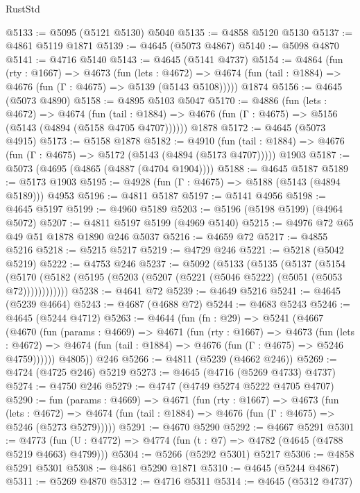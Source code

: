 \begin{lexlean}{RustStd}
\begin{coremodule}
@5133 := @5095 (@5121 @5130) @5040
@5135 := @4858 @5120 @5130
@5137 := @4861 @5119 @1871
@5139 := @4645 (@5073 @4867)
@5140 := @5098 @4870
@5141 := @4716 @5140
@5143 := @4645 (@5141 @4737)
@5154 := @4864
    (fun (rty : @1667) =>
    @4673
      (fun (lets : @4672) =>
      @4674 (fun (tail : @1884) => @4676 (fun (Γ : @4675) => @5139 (@5143 @5108)))))
    @1874
@5156 := @4645 (@5073 @4890)
@5158 := @4895 @5103 @5047
@5170 := @4886
    (fun (lets : @4672) =>
    @4674
      (fun (tail : @1884) => @4676 (fun (Γ : @4675) => @5156 (@5143 (@4894 (@5158 @4705 @4707))))))
    @1878
@5172 := @4645 (@5073 @4915)
@5173 := @5158 @1878
@5182 := @4910
    (fun (tail : @1884) => @4676 (fun (Γ : @4675) => @5172 (@5143 (@4894 (@5173 @4707)))))
    @1903
@5187 := @5073 (@4695 (@4865 (@4887 (@4704 @1904))))
@5188 := @4645 @5187
@5189 := @5173 @1903
@5195 := @4928 (fun (Γ : @4675) => @5188 (@5143 (@4894 @5189))) @4953
@5196 := @4811 @5187
@5197 := @5141 @4956
@5198 := @4645 @5197
@5199 := @4960 @5189
@5203 := @5196 (@5198 @5199) (@4964 @5072)
@5207 := @4811 @5197 @5199 (@4969 @5140)
@5215 := @4976 @72 @65 @49 @51 @1878 @1890 @246 @5037
@5216 := @4659 @72
@5217 := @4855 @5216
@5218 := @5215 @5217
@5219 := @4729 @246
@5221 := @5218 (@5042 @5219)
@5222 := @4753 @246
@5237 := @5092
    (@5133
      (@5135
        (@5137
          (@5154
            (@5170 (@5182 (@5195 (@5203 (@5207 (@5221 (@5046 @5222) (@5051 (@5053 @72))))))))))))
@5238 := @4641 @72
@5239 := @4649 @5216
@5241 := @4645 (@5239 @4664)
@5243 := @4687 (@4688 @72)
@5244 := @4683 @5243
@5246 := @4645 (@5244 @4712)
@5263 := @4644
    (fun (fn : @29) =>
    @5241
      (@4667
        (@4670
          (fun (params : @4669) =>
          @4671
            (fun (rty : @1667) =>
            @4673
              (fun (lets : @4672) =>
              @4674 (fun (tail : @1884) => @4676 (fun (Γ : @4675) => @5246 @4759))))))
        @4805))
    @246
@5266 := @4811 (@5239 (@4662 @246))
@5269 := @4724 (@4725 @246) @5219
@5273 := @4645 (@4716 (@5269 @4733) @4737)
@5274 := @4750 @246
@5279 := @4747 (@4749 @5274 @5222 @4705 @4707)
@5290 := fun (params : @4669) =>
  @4671
    (fun (rty : @1667) =>
    @4673
      (fun (lets : @4672) =>
      @4674 (fun (tail : @1884) => @4676 (fun (Γ : @4675) => @5246 (@5273 @5279)))))
@5291 := @4670 @5290
@5292 := @4667 @5291
@5301 := @4773 (fun (U : @4772) => @4774 (fun (t : @7) => @4782 (@4645 (@4788 @5219 @4663) @4799)))
@5304 := @5266 (@5292 @5301) @5217
@5306 := @4858 @5291 @5301
@5308 := @4861 @5290 @1871
@5310 := @4645 (@5244 @4867)
@5311 := @5269 @4870
@5312 := @4716 @5311
@5314 := @4645 (@5312 @4737)

\end{coremodule}
\end{lexlean}
